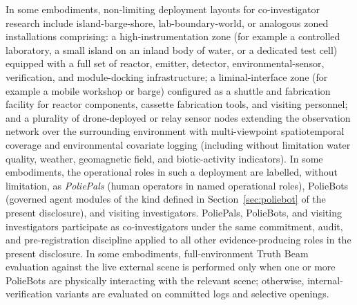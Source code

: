 \documentclass[a4paper,12pt]{article}
\begin{document}
In some embodiments, non-limiting deployment layouts for
co-investigator research include island-barge-shore,
lab-boundary-world, or analogous zoned installations comprising:
a high-instrumentation zone (for example a controlled laboratory,
a small island on an inland body of water, or a dedicated test
cell) equipped with a full set of reactor, emitter, detector,
environmental-sensor, verification, and module-docking
infrastructure; a liminal-interface zone (for example a mobile
workshop or barge) configured as a shuttle and fabrication
facility for reactor components, cassette fabrication tools, and
visiting personnel; and a plurality of drone-deployed or relay
sensor nodes extending the observation network over the
surrounding environment with multi-viewpoint spatiotemporal
coverage and environmental covariate logging (including without
limitation water quality, weather, geomagnetic field, and
biotic-activity indicators). In some embodiments, the operational
roles in such a deployment are labelled, without limitation, as
\emph{PoliePals} (human operators in named operational roles),
PolieBots (governed agent modules of the kind defined in
Section~\ref{sec:poliebot} of the present disclosure), and
visiting investigators. PoliePals, PolieBots, and visiting
investigators participate as co-investigators under the same
commitment, audit, and pre-registration discipline applied to all
other evidence-producing roles in the present disclosure. In some
embodiments, full-environment Truth Beam evaluation against the
live external scene is performed only when one or more PolieBots
are physically interacting with the relevant scene; otherwise,
internal-verification variants are evaluated on committed logs
and selective openings.
\end{document}
